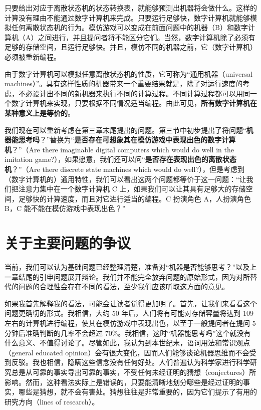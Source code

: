 \documentclass[12pt,a4paper,twoside]{article}
\begin{document}
只要给出对应于离散状态机的状态转换表，就能够预测出机器将会做什么。这样的计算没有理由不能通过数字计算机来完成。只要运行足够快，数字计算机就能够模拟任何离散状态机的行为。模仿游戏可以变成在前面问题中的机器（B）和数字计算机（A）之间进行，并且提问者将不能区分它们。当然，数字计算机除了必须有足够的存储空间，且运行足够快。并且，模仿不同的机器之前，它（数字计算机）必须被重新编程。

由于数字计算机可以模拟任意离散状态机的性质，它可称为“通用机器（universal machines）”。具有这样性质的机器带来一个重要结果就是，除了对运行速度的考虑，不必设计出不同的新机器来执行不同的计算过程。不同计算过程都可以用同一个数字计算机来实现，只要根据不同情况适当编程。由此可见，\textbf{所有数字计算机在某种意义上是等价的}。

我们现在可以重新考虑在第三章末尾提出的问题。第三节中初步提出了将问题“\textbf{机器能思考吗}？”替换为“\textbf{是否存在可想象其在模仿游戏中表现出色的数字计算机}？”（Are there imaginable digital computers which would do well in the imitation game?），如果愿意，我们还可以问“\textbf{是否存在表现出色的离散状态机}？”（Are there discrete state machines which would do well?），但是考虑到（数字计算机的）通用特性，我们可以看出这两个问题都等价于这一问题：“让我们把注意力集中在一个数字计算机 C 上，如果我们可以让其具有足够大的存储空间，足够快的计算速度，而且对它进行适当的编程。C 扮演角色 A，人扮演角色 B，C 能不能在模仿游戏中表现出色？”

\section{关于主要问题的争议}
当前，我们可以认为基础问题已经整理清楚，准备对“机器是否能够思考？”以及上一章结尾的引申问题展开辩论。我们并不能完全放弃问题的原始形式，因为对所替代的问题的合理性会存在不同的看法，至少我们应该听取这方面的意见。

如果我首先解释我的看法，可能会让读者觉得更加明了。首先，让我们来看看这个问题更确切的形式。我相信，大约 50 年后，人们将有可能对存储容量将达到 109 左右的计算机进行编程，使其在模仿游戏中表现出色，以至于一般提问者在提问 5 分钟后准确判断的几率不会超过 70\%。我相信，这时“机器能思考吗”这个就没有什么意义、不值得讨论了。尽管如此，我认为到本世纪末，语词用法和常识观点（general educated opinion）会有很大变化，因而人们能够谈论机器思维而不会受到反驳。我也相信，隐瞒这些信念没有任何好处。人们普遍认为科学家进行科学研究总是从可靠的事实导出可靠的事实，不受任何未经证明的猜想（conjectures）所影响。然而，这种看法实际上是错误的，只要能清晰地划分哪些是经过证明的事实，哪些是猜想，就不会有害处。猜想往往是非常重要的，因为它们提示了有用的研究方向（lines of research）。
\end{document}
